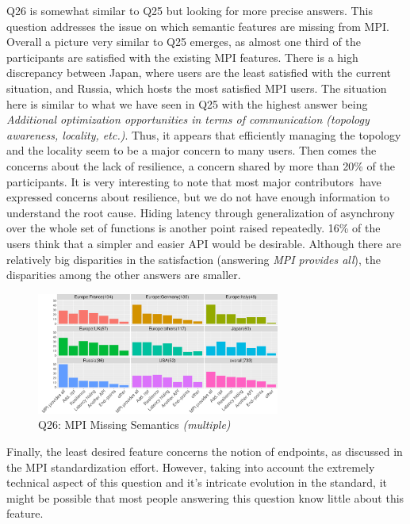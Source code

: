 \documentclass[preprint,5p,times]{elsarticle}
\def\myquote#1{{\it #1}}
\def\mcountries{major contributors\xspace{}}%
\begin{document}
Q26 is somewhat similar to Q25 but looking for more precise answers. This
question addresses the issue on which semantic features are missing from MPI.
Overall a picture very similar to Q25 emerges, as almost one third of the
participants are satisfied with the existing MPI features. There is a high
discrepancy between Japan, where users are the least satisfied with the current
situation, and Russia, which hosts the most satisfied MPI users.
%
The situation here is similar to what we have seen in Q25 with the highest answer
being \myquote{Additional optimization opportunities in terms of communication
(topology awareness, locality, etc.)}. Thus, it appears that efficiently
managing the topology and the locality seem to be a major concern to many users. Then
comes the concerns about the lack of resilience, a concern shared by more than
20\% of the participants. It is very interesting to note that most \mcountries\
have expressed concerns about resilience, but we do not have enough information
to understand the root cause. Hiding latency through generalization of
asynchrony over the whole set of functions is another point raised repeatedly.
16\% of the users think that a simpler and easier API would be desirable.
Although there are relatively big disparities in the satisfaction (answering
\myquote{MPI provides all}), the disparities among the other answers are smaller.

\begin{figure}[tb]
\begin{center}
\includegraphics[width=8.0cm]{R-scripts/Q26.pdf}
\vspace{-1.5mm}
\caption{Q26: MPI Missing Semantics {\it(multiple)}}
\label{fig:missing-semantics}
\vspace{-3mm}%
\end{center}
\end{figure}

Finally, the least desired feature concerns the notion of endpoints, as
discussed in the MPI standardization effort. However, taking into account the
extremely technical aspect of this question and it's intricate evolution in the
standard, it might be possible that most people answering this question know
little about this feature.
\end{document}

